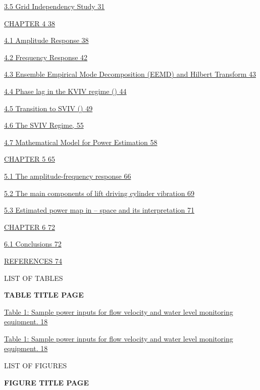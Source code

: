 \documentclass[]{article}
\begin{document}
\protect\hyperlink{grid-independency-study}{3.5 Grid Independency Study
31}

\protect\hyperlink{_Toc41048809}{CHAPTER 4 38}

\protect\hyperlink{_Toc41048810}{4.1 Amplitude Response 38}

\protect\hyperlink{frequency-response}{4.2 Frequency Response 42}

\protect\hyperlink{ensemble-empirical-mode-decomposition-eemd-and-hilbert-transform}{4.3
Ensemble Empirical Mode Decomposition (EEMD) and Hilbert Transform 43}

\protect\hyperlink{phase-lag-in-the-kviv-regime-mathbfumathbfmathbf-14}{4.4
Phase lag in the KVIV regime () 44}

\protect\hyperlink{_Toc41048814}{4.5 Transition to SVIV () 49}

\protect\hyperlink{the-sviv-regime-mathbfumathbfmathbf-20}{4.6 The SVIV
Regime, 55}

\protect\hyperlink{mathematical-model-for-power-estimation}{4.7
Mathematical Model for Power Estimation 58}

\protect\hyperlink{section-4}{CHAPTER 5 65}

\protect\hyperlink{the-amplitude-frequency-response}{5.1 The
amplitude-frequency response 66}

\protect\hyperlink{the-main-components-of-lift-driving-cylinder-vibration}{5.2
The main components of lift driving cylinder vibration 69}

\protect\hyperlink{estimated-power-map-in-mathbfalphamathbfumathbf-space-and-its-interpretation}{5.3
Estimated power map in -- space and its interpretation 71}

\protect\hyperlink{section-5}{CHAPTER 6 72}

\protect\hyperlink{conclusions}{6.1 Conclusions 72}

\protect\hyperlink{_Toc41048823}{REFERENCES 74}

\protect\hypertarget{_Toc41048787}{}{}LIST OF TABLES

\textbf{TABLE TITLE PAGE}

\protect\hyperlink{_Toc40994423}{Table 1: Sample power inputs for flow
velocity and water level monitoring equipment. 18}

\protect\hyperlink{_Toc12528554}{Table 1: Sample power inputs for flow
velocity and water level monitoring equipment. 18}

\protect\hypertarget{_Toc41048788}{}{}LIST OF FIGURES

\textbf{FIGURE TITLE PAGE}
\end{document}
